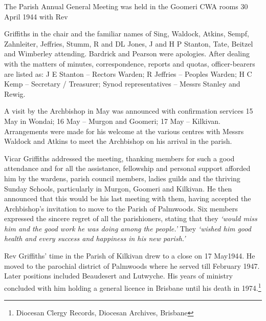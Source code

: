 The Parish Annual General Meeting was held in the Goomeri CWA rooms 30 April 1944 with Rev



Griffiths in the chair and the familiar names of Sing, Waldock, Atkins, Sempf, Zahnleiter, Jeffries, Stumm, R and DL Jones, J and H P Stanton, Tate, Beitzel and Wimberley attending. Bardrick and Pearson were apologies. After dealing with the matters of minutes, correspondence, reports and quotas, officer-bearers are listed as: J E Stanton -- Rectors Warden; R Jeffries -- Peoples Warden; H C Kemp -- Secretary / Treasurer; Synod representatives -- Messrs Stanley and Rewig.



A visit by the Archbishop in May was announced with confirmation services 15 May in Wondai; 16 May -- Murgon and Goomeri; 17 May -- Kilkivan. Arrangements were made for his welcome at the various centres with Messrs Waldock and Atkins to meet the Archbishop on his arrival in the parish.



Vicar Griffiths addressed the meeting, thanking members for such a good attendance and for all the assistance, fellowship and personal support afforded him by the wardens, parish council members, ladies guilds and the thriving Sunday Schools, particularly in Murgon, Goomeri and Kilkivan. He then announced that this would be his last meeting with them, having accepted the Archbishop's invitation to move to the Parish of Palmwoods. Six members expressed the sincere regret of all the parishioners, stating that they \emph{`would miss him and the good work he was doing among the people.'} They \emph{`wished him good health and every success and happiness in his new parish.'}



Rev Griffiths' time in the Parish of Kilkivan drew to a close on 17 May1944. He moved to the parochial district of Palmwoods where he served till February 1947. Later positions included Beaudesert and Lutwyche. His years of ministry concluded with him holding a general licence in Brisbane until his death in 1974.\footnote{Diocesan Clergy Records, Diocesan Archives, Brisbane}


\balance


